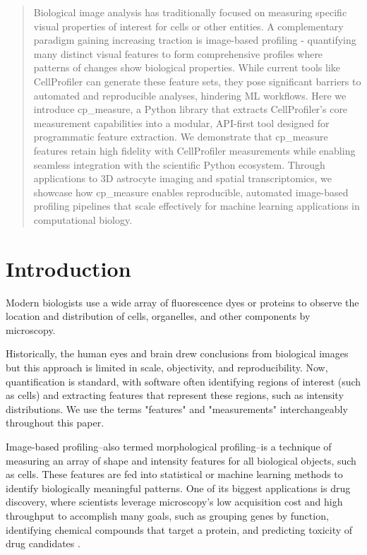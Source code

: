 \documentclass{article}
\begin{document}
\begin{abstract}
Biological image analysis has traditionally focused on measuring specific visual properties of interest for cells or other entities. A complementary paradigm gaining increasing traction is image-based profiling - quantifying many distinct visual features to form comprehensive profiles where patterns of changes show biological properties. While current tools like CellProfiler can generate these feature sets, they pose significant barriers to automated and reproducible analyses, hindering ML workflows. Here we introduce cp\_measure, a Python library that extracts CellProfiler's core measurement capabilities into a modular, API-first tool designed for programmatic feature extraction. We demonstrate that cp\_measure features retain high fidelity with CellProfiler measurements while enabling seamless integration with the scientific Python ecosystem. Through applications to 3D astrocyte imaging and spatial transcriptomics, we showcase how cp\_measure enables reproducible, automated image-based profiling pipelines that scale effectively for machine learning applications in computational biology.
\end{abstract}

\section{Introduction}
\label{sec:org4c9ba67}
Modern biologists use a wide array of fluorescence dyes or proteins to observe the location and distribution of cells, organelles, and other components by microscopy.

Historically, the human eyes and brain drew conclusions from biological images but this approach is limited in scale, objectivity, and reproducibility. Now, quantification is standard, with software often identifying regions of interest (such as cells) and extracting features that represent these regions, such as intensity distributions.
We use the terms "features" and "measurements" interchangeably throughout this paper.

Image-based profiling--also termed morphological profiling--is a technique of measuring an array of shape and intensity features for all biological objects, such as cells. These features are fed into statistical or machine learning methods to identify biologically meaningful patterns. One of its biggest applications is drug discovery, where scientists leverage microscopy's low acquisition cost and high throughput to accomplish many goals, such as grouping genes by function, identifying chemical compounds that target a protein, and predicting toxicity of drug candidates \citep{sealDecadeSystematicReview2024}. 
\end{document}
